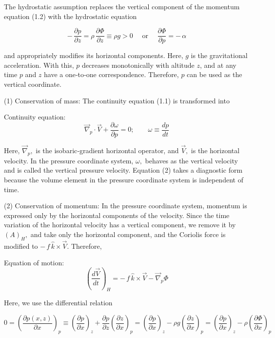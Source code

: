 \documentclass[12pt,openany]{book}
\begin{document}
The hydrostatic assumption replaces the vertical component of the
momentum equation (1.2) with the hydrostatic equation

\begin{equation}
-\,\frac{\partial p}{\partial z}
= \rho\,\frac{\partial \Phi}{\partial z}
\equiv \rho g > 0
\quad \text{ or } \quad
\frac{\partial \Phi}{\partial p}
= -\,\alpha
\tag{2.1}
\label{eq:2.1}
\end{equation}

and appropriately modifies its horizontal components.
Here, $g$ is the gravitational acceleration.
With this, $p$ decreases monotonically with altitude $z$, and at any
time $p$ and $z$ have a one‑to‑one correspondence.
Therefore, $p$ can be used as the vertical coordinate.

(1) Conservation of mass:
The continuity equation (1.1) is transformed into

Continuity equation:
\begin{equation}
\vec{\nabla}_p \cdot \vec{V}
+ \frac{\partial \omega}{\partial p}
= 0;
\qquad
\omega \equiv \frac{dp}{dt}
\tag{2.2}
\label{eq:2.2}
\end{equation}

Here, $\vec{\nabla}_p,$ is the isobaric‑gradient horizontal operator, and $\vec{V},$ is
the horizontal velocity.
In the pressure coordinate system, $\omega,$ behaves as the
vertical velocity and is called the vertical pressure velocity.
Equation (2) takes a diagnostic form because the volume element in the
pressure coordinate system is independent of time.

(2) Conservation of momentum:
In the pressure coordinate system, momentum is expressed only by the
horizontal components of the velocity.
Since the time variation of the horizontal velocity has a vertical
component, we remove it by $\left( A \right)_H,$ and take only the horizontal
component, and the Coriolis force is modified to $-\,f\,\hat{k} \times \vec{V}$.
Therefore,

Equation of motion:
\begin{equation}
\left( \frac{d \vec{V}}{dt} \right)_H
=
-\,f\,\hat{k} \times \vec{V}
-
\vec{\nabla}_p \Phi
\tag{2.3}
\label{eq:2.3}
\end{equation}

Here, we use the differential relation

\begin{equation*}
0
=
\left( \frac{\partial p(x,z)}{\partial x} \right)_p
\equiv
\left( \frac{\partial p}{\partial x} \right)_z
+
\frac{\partial p}{\partial z}
\left( \frac{\partial z}{\partial x} \right)_p
=
\left( \frac{\partial p}{\partial x} \right)_z
-
\rho g
\left( \frac{\partial z}{\partial x} \right)_p
=
\left( \frac{\partial p}{\partial x} \right)_z
-
\rho
\left( \frac{\partial \Phi}{\partial x} \right)_p
\end{equation*}
\end{document}
